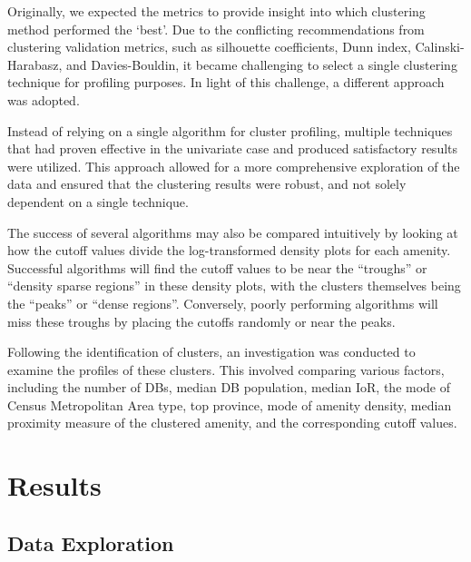 \documentclass[11pt, a4paper]{article}
\begin{document}
Originally, we expected the metrics to provide insight into which clustering method performed the `best'. Due to the conflicting recommendations from clustering validation metrics, such as silhouette coefficients, Dunn index, Calinski-Harabasz, and Davies-Bouldin, it became challenging to select a single clustering technique for profiling purposes. In light of this challenge, a different approach was adopted.
\par
Instead of relying on a single algorithm for cluster profiling, multiple techniques that had proven effective in the univariate case and produced satisfactory results were utilized. This approach allowed for a more comprehensive exploration of the data and ensured that the clustering results were robust, and not solely dependent on a single technique.
\par
The success of several algorithms may also be compared intuitively by looking at how the cutoff values divide the log-transformed density plots for each amenity. Successful algorithms will find the cutoff values to be near the ``troughs'' or “density sparse regions” in these density plots, with the clusters themselves being the ``peaks'' or ``dense regions''. Conversely, poorly performing algorithms will miss these troughs by placing the cutoffs randomly or near the peaks.
\par
Following the identification of clusters, an investigation was conducted to examine the profiles of these clusters. This involved comparing various factors, including the number of DBs, median DB population, median IoR, the mode of Census Metropolitan Area type, top province, mode of amenity density, median proximity measure of the clustered amenity, and the corresponding cutoff values.











\section{Results}




\subsection{Data Exploration}
\end{document}
